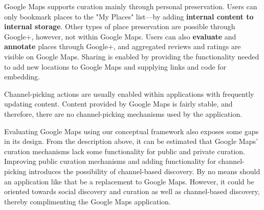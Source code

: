 \documentclass{sigchi}
\begin{document}
{Google Maps supports curation mainly through personal preservation. Users can only bookmark places to the "My Places" list---by adding \textbf{internal content to internal storage}. Other types of place preservation are possible through Google+, however, not within Google Maps. Users can also \textbf{evaluate} and \textbf{annotate} places through Google+, and aggregated reviews and ratings are visible on Google Maps. Sharing is enabled by providing the functionality needed to add new locations to Google Maps and supplying links and code for embedding.  

Channel-picking actions are usually enabled within applications with frequently updating content. Content provided by Google Maps is fairly stable, and therefore, there are no channel-picking mechanisms used by the application.

Evaluating Google Maps using our conceptual framework also exposes some gaps in its design. From the description above, it can be estimated that Google Maps' curation mechanisms lack some functionality for public and private curation. Improving public curation mechanisms and adding functionality for channel-picking introduces the possibility of channel-based discovery. By no means should an application like that be a replacement to Google Maps. However, it could be oriented towards social discovery and curation as well as channel-based discovery, thereby complimenting the Google Maps application.  

} %
\end{document}
